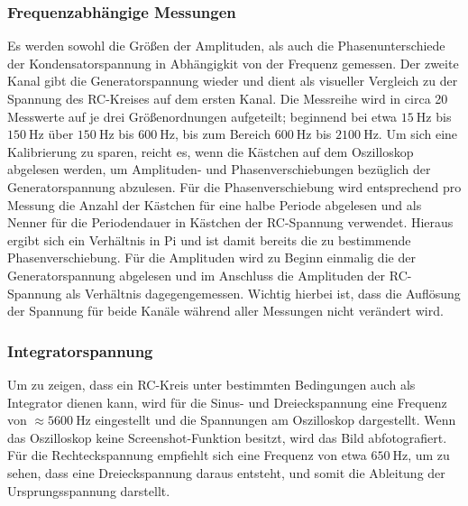 \subsubsection{Frequenzabhängige Messungen}
Es werden sowohl die Größen der Amplituden, als auch die Phasenunterschiede der Kondensatorspannung in Abhängigkit von der Frequenz gemessen.
Der zweite Kanal gibt die Generatorspannung wieder und dient als visueller Vergleich zu der Spannung des RC-Kreises auf dem ersten Kanal.
Die Messreihe wird in circa 20 Messwerte auf je drei Größenordnungen aufgeteilt; beginnend bei etwa $\SI{15}{\hertz}$ bis $\SI{150}{\hertz}$ über $\SI{150}{\hertz}$ bis $\SI{600}{\hertz}$, bis zum Bereich
$\SI{600}{\hertz}$ bis $\SI{2100}{\hertz}$.
Um sich eine Kalibrierung zu sparen, reicht es, wenn die Kästchen auf dem Oszilloskop abgelesen werden, um Amplituden- und Phasenverschiebungen
bezüglich der Generatorspannung abzulesen. Für die Phasenverschiebung wird entsprechend pro Messung die Anzahl der Kästchen für eine halbe Periode
abgelesen und als Nenner für die Periodendauer in Kästchen der RC-Spannung verwendet. Hieraus ergibt sich ein Verhältnis in Pi und ist damit bereits die zu bestimmende Phasenverschiebung.
Für die Amplituden wird zu Beginn einmalig die der Generatorspannung abgelesen und im Anschluss die Amplituden der RC-Spannung
als Verhältnis dagegengemessen. Wichtig hierbei ist, dass die Auflösung der Spannung für beide Kanäle während aller Messungen
nicht verändert wird.

\subsubsection{Integratorspannung}
Um zu zeigen, dass ein RC-Kreis unter bestimmten Bedingungen auch als Integrator dienen kann, wird für die Sinus- und Dreieckspannung
eine Frequenz von $\approx \SI{5600}{\hertz}$ eingestellt und die Spannungen am Oszilloskop dargestellt. Wenn das Oszilloskop keine Screenshot-Funktion besitzt,
wird das Bild abfotografiert.
Für die Rechteckspannung empfiehlt sich eine Frequenz von etwa $\SI{650}{\hertz}$, um zu sehen, dass eine Dreieckspannung daraus entsteht, und somit die Ableitung
der Ursprungsspannung darstellt.